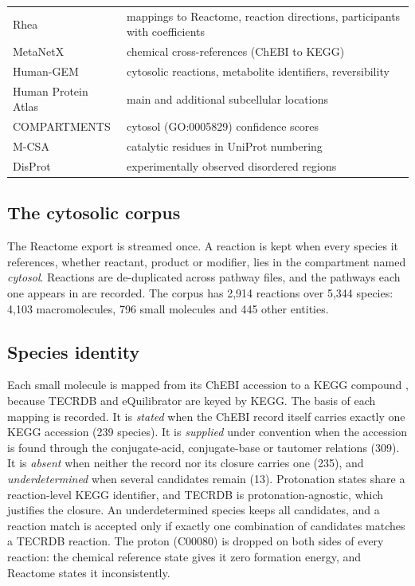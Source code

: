 \begin{table}[t]
\begin{tabularx}{\linewidth}{@{}l>{\raggedright\arraybackslash}X@{}}
Rhea \citep{bansal2022rhea} & mappings to Reactome, reaction directions, participants with coefficients \\
MetaNetX \citep{moretti2021metanetx} & chemical cross-references (ChEBI to KEGG) \\
Human-GEM \citep{robinson2020humangem} & cytosolic reactions, metabolite identifiers, reversibility \\
Human Protein Atlas \citep{thul2017hpa} & main and additional subcellular locations \\
COMPARTMENTS \citep{binder2014compartments} & cytosol (GO:0005829) confidence scores \\
M-CSA \citep{ribeiro2018mcsa} & catalytic residues in UniProt numbering \\
DisProt \citep{quaglia2022disprot} & experimentally observed disordered regions \\
\bottomrule
\end{tabularx}
\end{table}

\subsection{The cytosolic corpus}
\label{sec:corpus}

The Reactome export is streamed once.
A reaction is kept when every species it references, whether reactant, product or modifier, lies in the compartment named \emph{cytosol}.
Reactions are de-duplicated across pathway files, and the pathways each one appears in are recorded.
The corpus has 2{,}914 reactions over 5{,}344 species: 4{,}103 macromolecules, 796 small molecules and 445 other entities.

\subsection{Species identity}
\label{sec:identity}

Each small molecule is mapped from its ChEBI accession to a KEGG compound \citep{kanehisa2000kegg}, because TECRDB and eQuilibrator are keyed by KEGG.
The basis of each mapping is recorded.
It is \emph{stated} when the ChEBI record itself carries exactly one KEGG accession (239 species).
It is \emph{supplied} under convention  when the accession is found through the conjugate-acid, conjugate-base or tautomer relations (309).
It is \emph{absent} when neither the record nor its closure carries one (235), and \emph{underdetermined} when several candidates remain (13).
Protonation states share a reaction-level KEGG identifier, and TECRDB is protonation-agnostic, which justifies the closure.
An underdetermined species keeps all candidates, and a reaction match is accepted only if exactly one combination of candidates matches a TECRDB reaction.
The proton (C00080) is dropped on both sides of every reaction: the chemical reference state gives it zero formation energy, and Reactome states it inconsistently.

